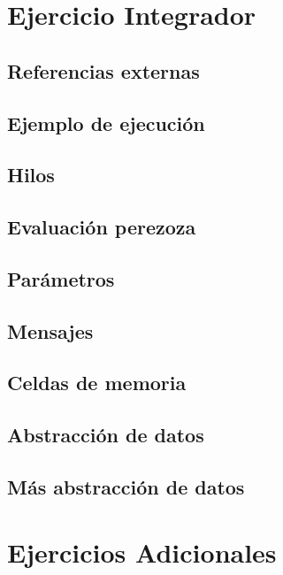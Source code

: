 \documentclass[12pt]{article}
\begin{document}
\tableofcontents

\clearpage

\section{Ejercicio Integrador}

\subsection{Referencias externas}

\subsection{Ejemplo de ejecución}

\subsection{Hilos}

\subsection{Evaluación perezoza}

\subsection{Parámetros}

\subsection{Mensajes}

\subsection{Celdas de memoria}

\subsection{Abstracción de datos}

\subsection{Más abstracción de datos}

\section{Ejercicios Adicionales}
\end{document}
